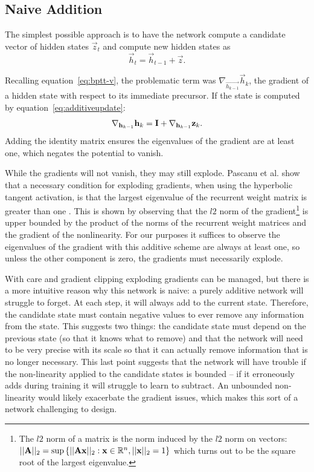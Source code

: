 \subsection{Naive Addition}\label{sec:additive}
The simplest possible approach is to have the network compute a candidate vector of hidden states
\(\vec{z}_t\) and compute new hidden states as
\begin{equation}\label{eq:additiveupdate}
	\vec{h}_t = \vec{h}_{t-1} + \vec{z}.
\end{equation}

Recalling equation~\eqref{eq:bptt-v}, the problematic term was \(\nabla_{\vec{h_{k-1}}}\vec{h}_k\),
the gradient of a hidden state with respect to its immediate precursor. If the state is computed by
equation~\eqref{eq:additiveupdate}:
\begin{equation}
	\nabla_{\mathbf{h}_{k-1}}\mathbf{h}_k = \mathbf{I} + \nabla_{\mathbf{h}_{k-1}}\mathbf{z}_k.
\end{equation} Adding the identity matrix ensures the eigenvalues of the gradient are at least
one, which negates the potential to vanish.

While the gradients will not vanish, they may still explode. Pascanu et al. show that a necessary
condition for exploding gradients, when using the hyperbolic tangent activation, is that the largest
eigenvalue of the recurrent weight matrix is greater than one \autocite{Pascanu2012}. This is shown by
observing that the \(l2\) norm of the gradient\footnote{
The \(l2\) norm of a matrix is the norm induced by the \(l2\) norm on vectors:\\
\(||\mathbf{A}||_2 = \sup \left\{||\mathbf{Ax}||_2: \mathbf{x} \in \mathbb{R}^n, ||\mathbf{x}||_2 = 1 \right\}\)
which turns out to be the square root of the largest eigenvalue.} is upper bounded by the product of the
norms of the recurrent weight matrices and the gradient of the nonlinearity. For our purposes it suffices
to observe the eigenvalues of the gradient with this additive scheme are always at least one, so unless
the other component is zero, the gradients must necessarily explode.

With care and gradient clipping \autocite{Pascanu2012} exploding gradients can be managed, but there
is a more intuitive reason why this network is naive: a purely additive
network will struggle to forget. At each step, it will always add to the current state. Therefore,
the candidate state must contain negative values to ever remove any information from the state. This
suggests two things: the candidate state must depend on the previous state (so that it knows what to
remove) and that the network will need to be very precise with its scale so that it can
actually remove information that is no longer necessary. This last point suggests that the network
will have trouble if the non-linearity applied to the candidate states is bounded -- if it erroneously
adds during training it will struggle to learn to subtract. An unbounded non-linearity would likely
exacerbate the gradient issues, which makes this sort of a network challenging to design.


